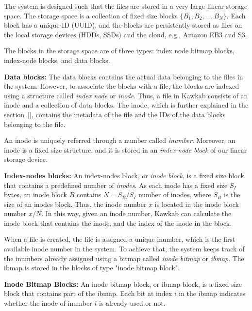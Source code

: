 \documentclass[]{article}
\newcommand{\subtopic}[1]{\vspace{1.5pt} \noindent \textbf{#1}}
\begin{document}
The system is designed such that the files are stored in a very large linear
storage space. The storage space is a collection of fixed size blocks $\{B_1,
B_2, \ldots, B_N\}$.  Each block has a unique ID (UUID), and the blocks are
persistently stored as files on the local storage devices (HDDs, SSDs) and the
cloud, e.g., Amazon EB3 and S3.

The blocks in the storage space are of three types: index node bitmap blocks,
index-node blocks, and data blocks.

\subtopic{Data blocks:} The data blocks contains the actual data belonging to
the files in the system. However, to associate the blocks with a file, the
blocks are indexed using a structure called \textit{index node} or
\textit{inode}. Thus, a file in Kawkab consists of an inode and a collection of
data blocks. The inode, which is further explained in the section~\ref{},
contains the metadata of the file and the IDs of the data blocks belonging
to the file. 

An inode is uniquely referred through a number called \textit{inumber}.
Moreover, an inode is a fixed size structure, and it is stored in an
\textit{index-node block} of our linear storage device.

\subtopic{Index-nodes blocks:} An index-nodes block, or \textit{inode block},
is a fixed size block that contains a predefined number of \textit{inodes}.
As each inode has a fixed size $S_I$ bytes, an inode block $B$ contains $N =
S_{B} / S_I$ number of inodes, where $S_B$ is the size of an inodes block.
Thus, the inode number $x$ is located in the inode block number $ x / N$. In
this way, given an inode number, Kawkab can calculate the inode block that
contains the inode, and the index of the inode in the block.

When a file is created, the file is assigned a unique inumber, which
is the first available inode number in the system. To achieve that, the
system keeps track of the inumbers already assigned using a bitmap
called \textit{inode bitmap} or \textit{ibmap}. The ibmap is stored in
the blocks of type "inode bitmap block".


\subtopic{Inode Bitmap Blocks:} An inode bitmap block, or ibmap block,
is a fixed size block that contains part of the ibmap. 
Each bit at index $i$ in the ibmap indicates whether the inode of inumber $i$ 
is already used or not. 
\end{document}
